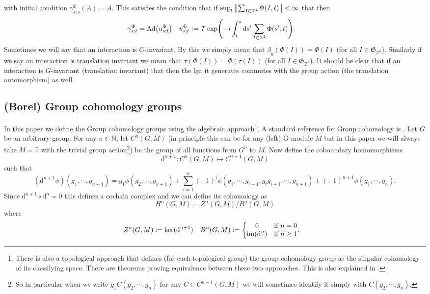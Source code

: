 \documentclass[12pt,a4paper,twoside]{article}
\renewcommand{\d}{\text{d}}
\newcommand{\defeq}{\vcentcolon=}
\let\originalleft\left
\let\originalright\right
\renewcommand{\left}{\mathopen{}\mathclose\bgroup\originalleft}
\renewcommand{\right}{\aftergroup\egroup\originalright}
\newcommand{\ZZ}{\mathbb Z}
\newcommand{\TT}{\mathbb T}
\newcommand{\NN}{\mathbb{N}}
\newcommand{\Ad}[1]{\textrm{Ad}\left(#1\right)}
\theoremstyle{definition}
\numberwithin{equation}{section}
\begin{document}
with initial condition $\gamma^{\Phi}_{s;s}(A)=A$. This satisfies the condition that if $\sup_t\norm{\sum_{I\subset\ZZ^2}\Phi(I,t)}<\infty$ that then
\begin{align}
	\gamma^\Phi_{s;t}&=\Ad{u^\Phi_{s;t}}&u^\Phi_{s;t}&\defeq\mathcal{T}\exp(-i\int_t^s\d s'\sum_{I\subset\ZZ^2}\Phi(s',t)).
\end{align}
Sometimes we will say that an interaction is $G$-invariant. By this we simply mean that $\beta_g(\Phi(I))=\Phi(I)$ (for all $I\in\mathfrak{G}_{\ZZ^2}$). Similarly if we say an interaction is translation invariant we mean that $\tau(\Phi(I))=\Phi(\tau(I))$ (for all $I\in\mathfrak{G}_{\ZZ^2}$). It should be clear that if an interaction is $G$-invariant (translation invariant) that then the lga it generates commutes with the group action (the translation automorphism) as well.
\subsection{(Borel) Group cohomology groups}\label{sec:GroupCohomology}
In this paper we define the Group cohomology groups using the algebraic approach\footnote{There is also a topological approach that defines (for each topological group) the group cohomology group as the singular cohomology of its classifying space. There are theorems proving equivalence between these two approaches. This is also explained in \cite{benson1991representations}.}. A standard reference for Group cohomology is \cite{benson1991representations}. Let $G$ be an arbitrary group. For any $n\in\NN$, let $C^n(G,M)$ (in principle this can be for any (left) G-module $M$ but in this paper we will always take $M=\TT$ with the trivial group action\footnote{So in particular when we write $g_1 C(g_2,\cdots,g_n)$ for any $C\in C^{n-1}(G,M)$ we will sometimes identify it simply with $C(g_2,\cdots,g_n)$.}) be the group of all functions from $G^n$ to $M$. Now define the coboundary homomorphisms
\begin{equation}
	\d^{n+1}:C^n(G,M)\mapsto C^{n+1}(G,M)
\end{equation}
such that
\begin{equation}
	(\d^{n+1}\phi)(g_1,\cdots,g_{n+1})=g_1\phi(g_2,\cdots,g_{n+1})+\sum_{i=1}^n (-1)^i \phi(g_1,\cdots,g_{i-1},g_{i}g_{i+1},\cdots,g_{n+1})+(-1)^{n+1}\phi(g_1,\cdots,g_n).
\end{equation}
Since $\d^{n+1}\circ\d^{n}=0$ this defines a cochain complex and we can define its cohomology as
\begin{equation}
	H^n(G,M)=Z^n(G,M)/B^n(G,M)
\end{equation}
where
\begin{align}
	Z^n(G,M)&\defeq \ker(\d^{n+1})&B^n(G,M)&\defeq \left\{\begin{matrix}
	0&\text{if }n=0\\\textrm{im}(\d^n)&\text{if }n\geq 1
	\end{matrix}\right. .
\end{align}
\end{document}

